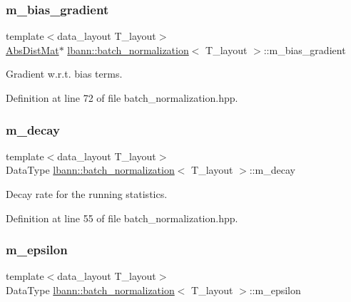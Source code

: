 \subsubsection{\texorpdfstring{m\+\_\+bias\+\_\+gradient}{m\_bias\_gradient}}
{\footnotesize\ttfamily template$<$data\+\_\+layout T\+\_\+layout$>$ \\
\hyperlink{base_8hpp_a9a697a504ae84010e7439ffec862b470}{Abs\+Dist\+Mat}$\ast$ \hyperlink{classlbann_1_1batch__normalization}{lbann\+::batch\+\_\+normalization}$<$ T\+\_\+layout $>$\+::m\+\_\+bias\+\_\+gradient\hspace{0.3cm}{\ttfamily [private]}}

Gradient w.\+r.\+t. bias terms. 

Definition at line 72 of file batch\+\_\+normalization.\+hpp.

\mbox{\label{classlbann_1_1batch__normalization_aa2ee72d5efbf47c74796510ee61dbb14}} 
\subsubsection{\texorpdfstring{m\+\_\+decay}{m\_decay}}
{\footnotesize\ttfamily template$<$data\+\_\+layout T\+\_\+layout$>$ \\
Data\+Type \hyperlink{classlbann_1_1batch__normalization}{lbann\+::batch\+\_\+normalization}$<$ T\+\_\+layout $>$\+::m\+\_\+decay\hspace{0.3cm}{\ttfamily [private]}}

Decay rate for the running statistics. 

Definition at line 55 of file batch\+\_\+normalization.\+hpp.

\mbox{\label{classlbann_1_1batch__normalization_ab82e74f905b7a117d9940f8542451e37}} 
\subsubsection{\texorpdfstring{m\+\_\+epsilon}{m\_epsilon}}
{\footnotesize\ttfamily template$<$data\+\_\+layout T\+\_\+layout$>$ \\
Data\+Type \hyperlink{classlbann_1_1batch__normalization}{lbann\+::batch\+\_\+normalization}$<$ T\+\_\+layout $>$\+::m\+\_\+epsilon\hspace{0.3cm}{\ttfamily [private]}}

